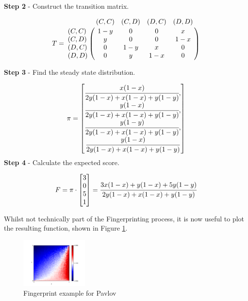 \textbf{Step 2} - Construct the transition matrix.

\begin{equation}\label{eq:transition_matrix}
%
T = \bordermatrix{~      & (C, C) & (C, D) & (D, C) & (D, D) \cr
                  (C, C) & 1 - y  & 0      & 0      & x      \cr
                  (C, D) & y      & 0      & 0      & 1 - x  \cr
                  (D, C) & 0      & 1 - y  & x      & 0      \cr
                  (D, D) & 0      & y      & 1 - x  & 0}
%
\end{equation}

\textbf{Step 3} - Find the steady state distribution.

\begin{equation}\label{eq:steady_state}
%
\pi =
\begin{bmatrix}
\cfrac{x (1 - x)}{2y(1-x) + x(1-x) + y(1-y)}, \\
\cfrac{y (1 - x)}{2y(1-x) + x(1-x) + y(1-y)}, \\
\cfrac{y (1 - y)}{2y(1-x) + x(1-x) + y(1-y)}, \\
\cfrac{y (1 - x)}{2y(1-x) + x(1-x) + y(1-y)}
\end{bmatrix}
\end{equation}
\textbf{Step 4} - Calculate the expected score.

\begin{equation}
F = \pi \cdot
\begin{bmatrix}
3 \\
0 \\
5 \\
1
\end{bmatrix}
=
\cfrac{3x(1-x) + y(1-x) + 5y(1-y)}{2y(1-x) + x(1-x) + y(1-y)}
\end{equation}

Whilst not technically part of the Fingerprinting process, it is now useful to plot the resulting function, shown in Figure \ref{fig:pavlov_fing_ex}.

\begin{figure}[htbp!]
\centering
\includegraphics[width = 0.3\textwidth]{../img/Numerical/Win_Stay_Lose_Shift.png}
\caption{Fingerprint example for Pavlov}
\label{fig:pavlov_fing_ex}
\end{figure}

